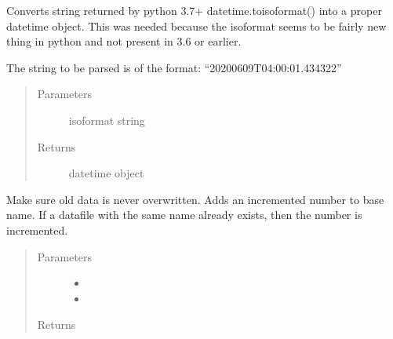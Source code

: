 \documentclass[letterpaper,10pt,english]{sphinxmanual}
\begin{document}
\begin{fulllineitems}
\label{\detokenize{autodocs/misc:listmode.misc.fromisoformat}}
\sphinxAtStartPar
Converts string returned by python 3.7+ datetime.toisoformat() into a proper datetime object. This was needed
because the isoformat seems to be fairly new thing in python and not present in 3.6 or earlier.

\sphinxAtStartPar
The string to be parsed is of the format: “2020\sphinxhyphen{}06\sphinxhyphen{}09T04:00:01.434322”
\begin{quote}\begin{description}
\item[{Parameters}] \leavevmode
\sphinxAtStartPar
{} \textendash{} isoformat string

\item[{Returns}] \leavevmode
\sphinxAtStartPar
datetime object

\end{description}\end{quote}

\end{fulllineitems}


\begin{fulllineitems}
\label{\detokenize{autodocs/misc:listmode.misc.make_run_id}}
\sphinxAtStartPar
Make sure old data is never overwritten. Adds an incremented number to base name. If a datafile with the same name
already exists, then the number is incremented.
\begin{quote}\begin{description}
\item[{Parameters}] \leavevmode\begin{itemize}
\item {} 
\sphinxAtStartPar
{} \textendash{} 

\item {} 
\sphinxAtStartPar
{} \textendash{} 

\end{itemize}

\item[{Returns}] \leavevmode
\sphinxAtStartPar


\end{description}\end{quote}

\end{fulllineitems}
\end{document}
